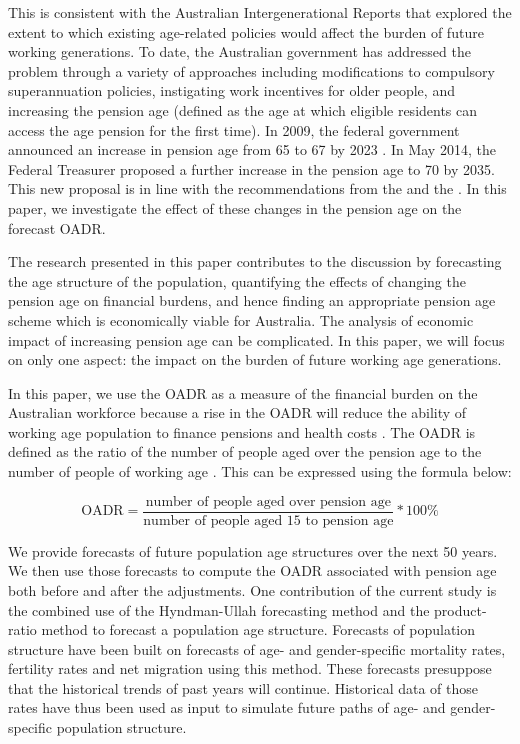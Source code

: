 \documentclass[11pt,a4paper,]{article}
\begin{document}
This is consistent with the Australian Intergenerational Reports
\autocites{IGR02}{IGR07}{Swan2010} that explored the extent to which
existing age-related policies would affect the burden of future working
generations. To date, the Australian government has addressed the
problem through a variety of approaches including modifications to
compulsory superannuation policies, instigating work incentives for
older people, and increasing the pension age (defined as the age at
which eligible residents can access the age pension for the first time).
In 2009, the federal government announced an increase in pension age
from 65 to 67 by 2023 \autocite{Nielson2010}. In May 2014, the Federal
Treasurer proposed a further increase in the pension age to 70 by 2035.
This new proposal is in line with the recommendations from the
\textcite{PC13} and the \textcite{NCOA2014}. In this paper, we
investigate the effect of these changes in the pension age on the
forecast OADR.

The research presented in this paper contributes to the discussion by
forecasting the age structure of the population, quantifying the effects
of changing the pension age on financial burdens, and hence finding an
appropriate pension age scheme which is economically viable for
Australia. The analysis of economic impact of increasing pension age can
be complicated. In this paper, we will focus on only one aspect: the
impact on the burden of future working age generations.

In this paper, we use the OADR as a measure of the financial burden on
the Australian workforce because a rise in the OADR will reduce the
ability of working age population to finance pensions and health costs
\autocites{ARW07}{IGR02}{IGR07}. The OADR is defined as the ratio of the
number of people aged over the pension age to the number of people of
working age \autocite{ARW07}. This can be expressed using the formula
below:

\begin{equation}
  \text{OADR} = \frac{\text{number of people aged over pension age}}{\text{number of people aged 15 to pension age}}*100\%
\end{equation}

We provide forecasts of future population age structures over the next
50 years. We then use those forecasts to compute the OADR associated
with pension age both before and after the adjustments. One contribution
of the current study is the combined use of the Hyndman-Ullah
forecasting method \autocite{HU07} and the product-ratio method
\autocite{HBY13} to forecast a population age structure. Forecasts of
population structure have been built on forecasts of age- and
gender-specific mortality rates, fertility rates and net migration using
this method. These forecasts presuppose that the historical trends of
past years will continue. Historical data of those rates have thus been
used as input to simulate future paths of age- and gender-specific
population structure.
\end{document}
